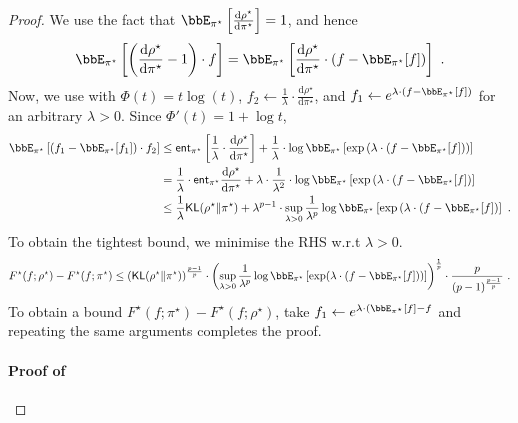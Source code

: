 \documentclass[11pt]{article}
\newcounter{ct}
\newcommand{\rmd}{\mathrm{d}}
\newcommand{\ent}{\mathsf{ent}}
\begin{document}
\begin{proof}
We use the fact that \(\bbE_{\pi^{\star}}\left[\frac{\rmd \rho^{\star}}{\rmd \pi^{\star}}\right] = 1\), and hence
\begin{equation*}
    \bbE_{\pi^{\star}}\left[\left(\frac{\rmd \rho^{\star}}{\rmd \pi^{\star}} - 1\right) \cdot f\right] = \bbE_{\pi^{\star}}\left[\frac{\rmd \rho^{\star}}{\rmd \pi^{\star}} \cdot (f - \bbE_{\pi^{\star}}[f])\right]~.
\end{equation*}
Now, we use  with \(\Phi(t) = t \log(t)\), \(f_{2} \leftarrow \frac{1}{\lambda} \cdot \frac{\rmd \rho^{\star}}{\rmd \pi^{\star}}\), and \(f_{1} \leftarrow e^{\lambda \cdot (f - \bbE_{\pi^{\star}}[f])}\) for an arbitrary \(\lambda > 0\).
Since \(\Phi'(t) = 1 + \log t\),
\begin{align*}
    \bbE_{\pi^{\star}}\left[(f_{1} - \bbE_{\pi^{\star}}[f_{1}]) \cdot f_{2}\right] &\leq \ent_{\pi^{\star}}\left[\frac{1}{\lambda} \cdot \frac{\rmd \rho^{\star}}{\rmd \pi^{\star}}\right] + \frac{1}{\lambda} \cdot \log \bbE_{\pi^{\star}}\left[\exp\left(\lambda \cdot (f - \bbE_{\pi^{\star}}[f])\right)\right] \\
    &= \frac{1}{\lambda} \cdot \ent_{\pi^{\star}}\frac{\rmd \rho^{\star}}{\rmd \pi^{\star}} + \lambda \cdot \frac{1}{\lambda^{2}} \cdot \log \bbE_{\pi^{\star}}\left[\exp\left(\lambda \cdot (f - \bbE_{\pi^{\star}}[f]\right)\right] \\
    &\leq \frac{1}{\lambda} \mathsf{KL}(\rho^{\star} \| \pi^{\star}) + \lambda^{p - 1} \cdot \sup_{\lambda > 0} \frac{1}{\lambda^{p}} \log \bbE_{\pi^{\star}}\left[\exp\left(\lambda \cdot (f - \bbE_{\pi^{\star}}[f]\right)\right]~.
\end{align*}
To obtain the tightest bound, we minimise the RHS w.r.t \(\lambda > 0\).
\begin{equation*}
    F^{\star}(f; \rho^{\star}) - F^{\star}(f; \pi^{\star}) \leq \left(\mathsf{KL}(\rho^{\star} \| \pi^{\star})\right)^{\frac{p - 1}{p}} \cdot \left(\sup_{\lambda > 0} \frac{1}{\lambda^{p}} \log \bbE_{\pi^{\star}}\left[\exp(\lambda \cdot (f - \bbE_{\pi^{\star}}[f]))\right] \right)^{\frac{1}{p}} \cdot \frac{p}{(p - 1)^{\frac{p - 1}{p}}}~.
\end{equation*}
To obtain a bound \(F^{\star}(f; \pi^{\star}) - F^{\star}(f; \rho^{\star})\), take \(f_{1} \leftarrow e^{\lambda \cdot (\bbE_{\pi^{\star}}[f] - f}\) and repeating the same arguments completes the proof.

\paragraph{Proof of }


\end{proof}
\end{document}
